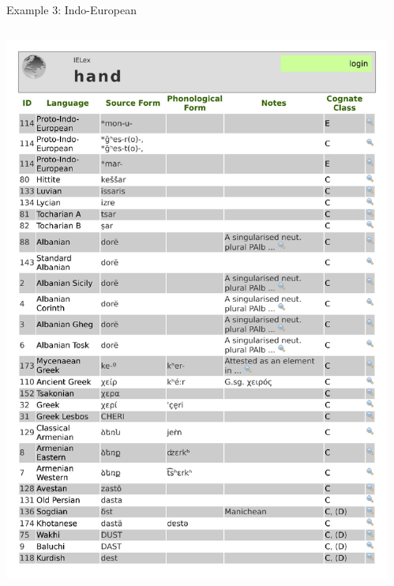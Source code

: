 \documentclass[9pt]{beamer}
\begin{document}
\begin{frame}{Example 3: Indo-European}
  \begin{columns}
    \begin{column}{0.5\textwidth}
      \footnotemark\includegraphics[width=\textwidth,page=1,trim={0.5cm 4.5cm 0.5cm 0.5cm},clip]{ielex.pdf}
    \end{column}
    \begin{column}{0.5\textwidth}

\end{column}
\end{columns}
\end{frame}
\end{document}
